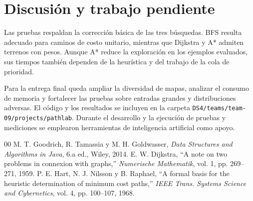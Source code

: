 \documentclass[conference]{IEEEtran}
\begin{document}
\section{Discusi\'on y trabajo pendiente}
Las pruebas respaldan la correcci\'on b\'asica de las tres b\'usquedas. BFS resulta adecuado para caminos de costo unitario, mientras que Dijkstra y A* admiten terrenos con pesos. Aunque A* reduce la exploraci\'on en los ejemplos evaluados, sus tiempos tambi\'en dependen de la heur\'istica y del trabajo de la cola de prioridad.

Para la entrega final queda ampliar la diversidad de mapas, analizar el consumo de memoria y fortalecer las pruebas sobre entradas grandes y distribuciones adversas. El c\'odigo y los resultados se incluyen en la carpeta \texttt{DS4/teams/team-09/projects/pathlab}. Durante el desarrollo y la ejecuci\'on de pruebas y mediciones se emplearon herramientas de inteligencia artificial como apoyo.

\begin{thebibliography}{00}
 M. T. Goodrich, R. Tamassia y M. H. Goldwasser, \textit{Data Structures and Algorithms in Java}, 6.a ed., Wiley, 2014.
 E. W. Dijkstra, ``A note on two problems in connexion with graphs,'' \textit{Numerische Mathematik}, vol. 1, pp. 269--271, 1959.
 P. E. Hart, N. J. Nilsson y B. Raphael, ``A formal basis for the heuristic determination of minimum cost paths,'' \textit{IEEE Trans. Systems Science and Cybernetics}, vol. 4, pp. 100--107, 1968.
\end{thebibliography}
\end{document}
